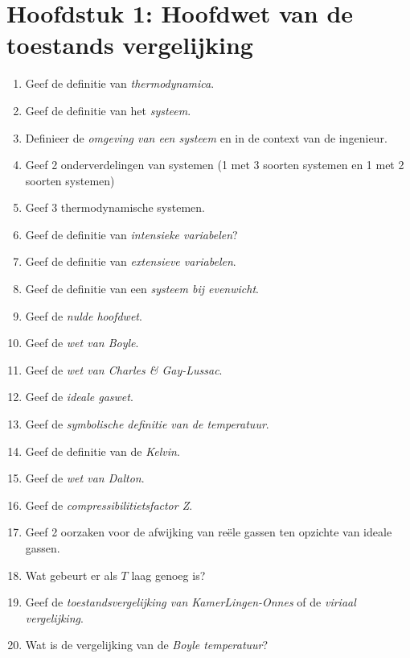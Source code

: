\documentclass[12pt]{article}
\begin{document}
    \maketitle

	\section{Hoofdstuk 1: Hoofdwet van de toestands vergelijking}%
	\label{sec:Hoofdstuk_1}
	\begin{enumerate}
		\item Geef de definitie van \emph{thermodynamica}.
		\item Geef de definitie van het \emph{systeem}.
		\item Definieer de \emph{omgeving van een systeem} en in de context van de ingenieur.
		\item Geef 2 onderverdelingen van systemen (1 met 3 soorten systemen en 1 met 2 soorten systemen)
		\item Geef 3 thermodynamische systemen.
		\item Geef de definitie van \emph{intensieke variabelen}?
		\item Geef de definitie van \emph{extensieve variabelen}.
		\item Geef de definitie van een \emph{systeem bij evenwicht}.
		\item Geef de \emph{nulde hoofdwet}.
		\item Geef de \emph{wet van Boyle}.
		\item Geef de \emph{wet van Charles \& Gay-Lussac}.
		\item Geef de \emph{ideale gaswet}.
		\item Geef de \emph{symbolische definitie van de temperatuur}.
		\item Geef de definitie van de \emph{Kelvin}.
		\item Geef de \emph{wet van Dalton}.
		\item Geef de \emph{compressibilitietsfactor Z}.
		\item Geef 2 oorzaken voor de afwijking van re\"ele gassen ten opzichte van ideale gassen.
		\item Wat gebeurt er als $T$ laag genoeg is?
		\item Geef de \emph{toestandsvergelijking van KamerLingen-Onnes} of de \emph{viriaal vergelijking}.
		\item Wat is de vergelijking van de \emph{Boyle temperatuur}?
	\end{enumerate}
\end{document}
